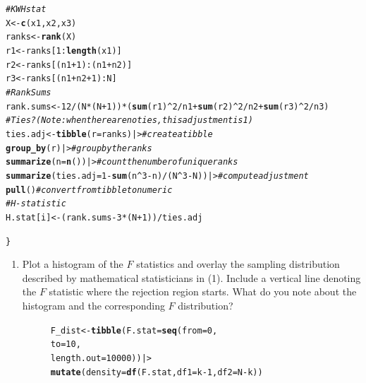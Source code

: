 \documentclass{article}\usepackage[]{graphicx}\usepackage[]{xcolor}
\makeatletter
\newcommand{\hlnum}[1]{\textcolor[rgb]{0.686,0.059,0.569}{#1}}%
\newcommand{\hlcom}[1]{\textcolor[rgb]{0.678,0.584,0.686}{\textit{#1}}}%
\newcommand{\hlopt}[1]{\textcolor[rgb]{0,0,0}{#1}}%
\newcommand{\hldef}[1]{\textcolor[rgb]{0.345,0.345,0.345}{#1}}%
\newcommand{\hlkwb}[1]{\textcolor[rgb]{0.69,0.353,0.396}{#1}}%
\newcommand{\hlkwc}[1]{\textcolor[rgb]{0.333,0.667,0.333}{#1}}%
\newcommand{\hlkwd}[1]{\textcolor[rgb]{0.737,0.353,0.396}{\textbf{#1}}}%
\newenvironment{kframe}{%
 \def\at@end@of@kframe{}%
 \ifinner\ifhmode%
  \def\at@end@of@kframe{\end{minipage}}%
  \begin{minipage}{\columnwidth}%
 \fi\fi%
 \def\FrameCommand##1{\hskip\@totalleftmargin \hskip-\fboxsep
 \colorbox{shadecolor}{##1}\hskip-\fboxsep
     \hskip-\linewidth \hskip-\@totalleftmargin \hskip\columnwidth}%
 \MakeFramed {\advance\hsize-\width
   \@totalleftmargin\z@ \linewidth\hsize
   \@setminipage}}%
 {\par\unskip\endMakeFramed%
 \at@end@of@kframe}
\newenvironment{knitrout}{}{} %
\makeatother
\begin{document}
\begin{enumerate}
\begin{knitrout}
\begin{kframe}
\begin{alltt}
  \hlcom{# KW H stat}
  \hldef{X} \hlkwb{<-} \hlkwd{c}\hldef{(x1, x2, x3)}
  \hldef{ranks} \hlkwb{<-} \hlkwd{rank}\hldef{(X)}
  \hldef{r1} \hlkwb{<-} \hldef{ranks[}\hlnum{1}\hlopt{:}\hlkwd{length}\hldef{(x1)]}
  \hldef{r2} \hlkwb{<-} \hldef{ranks[(n1}\hlopt{+}\hlnum{1}\hldef{)}\hlopt{:}\hldef{(n1}\hlopt{+}\hldef{n2)]}
  \hldef{r3} \hlkwb{<-} \hldef{ranks[(n1}\hlopt{+}\hldef{n2}\hlopt{+}\hlnum{1}\hldef{)}\hlopt{:}\hldef{N]}
  \hlcom{# Rank Sums}
  \hldef{rank.sums} \hlkwb{<-} \hlnum{12}\hlopt{/}\hldef{(N}\hlopt{*}\hldef{(N}\hlopt{+}\hlnum{1}\hldef{))} \hlopt{*} \hldef{(}\hlkwd{sum}\hldef{(r1)}\hlopt{^}\hlnum{2}\hlopt{/}\hldef{n1} \hlopt{+} \hlkwd{sum}\hldef{(r2)}\hlopt{^}\hlnum{2}\hlopt{/}\hldef{n2} \hlopt{+} \hlkwd{sum}\hldef{(r3)}\hlopt{^}\hlnum{2}\hlopt{/}\hldef{n3)}
  \hlcom{# Ties? (Note: when there are no ties, this adjustment is 1)}
  \hldef{ties.adj} \hlkwb{<-} \hlkwd{tibble}\hldef{(}\hlkwc{r}\hldef{=ranks) |>} \hlcom{# create a tibble}
    \hlkwd{group_by}\hldef{(r) |>}               \hlcom{# group by the ranks}
    \hlkwd{summarize}\hldef{(}\hlkwc{n}\hldef{=}\hlkwd{n}\hldef{())|>}           \hlcom{# count the number of unique ranks}
    \hlkwd{summarize}\hldef{(}\hlkwc{ties.adj} \hldef{=} \hlnum{1}\hlopt{-}\hlkwd{sum}\hldef{(n}\hlopt{^}\hlnum{3}\hlopt{-}\hldef{n)}\hlopt{/}\hldef{(N}\hlopt{^}\hlnum{3}\hlopt{-}\hldef{N))|>} \hlcom{# compute adjustment}
    \hlkwd{pull}\hldef{()} \hlcom{# convert from tibble to numeric}
  \hlcom{# H-statistic}
  \hldef{H.stat[i]} \hlkwb{<-} \hldef{(rank.sums} \hlopt{-} \hlnum{3}\hlopt{*}\hldef{(N}\hlopt{+}\hlnum{1}\hldef{))}\hlopt{/}\hldef{ties.adj}

\hldef{\}}
\end{alltt}
\end{kframe}
\end{knitrout}


\begin{enumerate}
\item Plot a histogram of the $F$ statistics and overlay the sampling 
distribution described by mathematical statisticians in (1). Include a 
vertical line denoting the $F$ statistic where the rejection region starts. 
What do you note about the histogram and the corresponding $F$ distribution?

\begin{figure}[H]

\centering

\begin{knitrout}\scriptsize
{}\color{fgcolor}\begin{kframe}
\begin{alltt}
\hldef{F_dist} \hlkwb{<-} \hlkwd{tibble}\hldef{(}\hlkwc{F.stat} \hldef{=} \hlkwd{seq}\hldef{(}\hlkwc{from} \hldef{=} \hlnum{0}\hldef{,}
                              \hlkwc{to} \hldef{=} \hlnum{10}\hldef{,}
                              \hlkwc{length.out} \hldef{=} \hlnum{10000}\hldef{)) |>}
  \hlkwd{mutate}\hldef{(}\hlkwc{density} \hldef{=} \hlkwd{df}\hldef{(F.stat,} \hlkwc{df1} \hldef{= k}\hlopt{-}\hlnum{1}\hldef{,} \hlkwc{df2} \hldef{= N}\hlopt{-}\hldef{k))}


\end{alltt}
\end{kframe}
\end{knitrout}
\end{figure}
\end{enumerate}
\end{enumerate}
\end{document}
